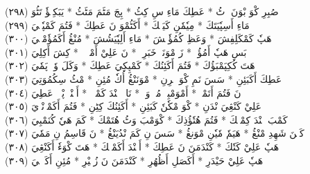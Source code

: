 \documentclass[a4paper, 10pt]{report}
\begin{document}
\begin{center}
\textarabic{(٢٩٨) \textcolor{mygreen}{صُبِرِ كْوَ بْوَنَ وٖٹُ  * عَطِكَ مَاءِ سِ كِٹُ  * پِجَ مَٹَمَ مَٹَٹُ  * يَبَكِيٖؤٗ تَٹُوَ }} 
\\[5mm] 

\textarabic{(٢٩٩) \textcolor{mygreen}{مَاءِ أَسِپٗيَتَكَ  * مِيٗمٗنِ كَيَپٖكَ  * أَكَٹُمْوَ نَ عَطِكَ  * فَتُمَ كَمْپٗكٖيَ }} 
\\[5mm] 

\textarabic{(٣٠٠) \textcolor{mygreen}{هَپٗ كَمْكَلِفِشَ  * وَعَظِ كُمُؤٗنٖشَ  * مَاءِ أَلِپٗيَشُشَ  * مُنْڠُ أَكَمُؤٗمْبٖيَ }} 
\\[5mm] 

\textarabic{(٣٠١) \textcolor{mygreen}{بَسِ هَپٗ أَمُؤُزٖ  * زَ مْوَنَوٖ خَبَرِزٖ  * نَ عَلِيْ أَمْوٖلٖزٖ  * كِشَ أَكِلِيَ }} 
\\[5mm] 

\textarabic{(٣٠٢) \textcolor{mygreen}{هَتَ كُكِپَمْبَؤُكَ  * فَتُمَ أَكَئِنُكَ  * كَمْپِكِيَ عَطِكَ  * وَكَلَ وٗتٖ پَمٗيَ }} 
\\[5mm] 

\textarabic{(٣٠٣) \textcolor{mygreen}{عَطِكَ أَكَبَئِنِ  * سَسَ نَمِ كْوَ خٖرِنِ  * مْوَنَنْڠُ أُكٗ مُئِنِ  * مْٹُ سِكُمُوَتِيَ }} 
\\[5mm] 

\textarabic{(٣٠٤) \textcolor{mygreen}{نَ فَتُمَ أَتَمْكٖ  * أَمْوَمْبِيٖ مُمٖ وَكٖ  * نَاوٖ نٖنْدَ كَمْپٖكٖ  * أَسٖنْدٖ پْوٖكٖ عَطِيَ }} 
\\[5mm] 

\textarabic{(٣٠٥) \textcolor{mygreen}{عَلِيْ كَنْڠِيَ نْدَنِ  * كْوَ مْكٗنٗ كَبَئِنِ  * أَكَئِنُكَ كِٹِنِ  * فَتُمَ أَكَمْوٖنْدٖيَ }} 
\\[5mm] 

\textarabic{(٣٠٦) \textcolor{mygreen}{كَمْبَ چٖنْدَ كِمْپٖكَ  * فَتُمَ هُتٗؤُذِكَ  * كْوَمْبَ وَٹُ هُتَمْكَ  * كَمَ هَيٗ كُنَمْبِيَ }} 
\\[5mm] 

\textarabic{(٣٠٧) \textcolor{mygreen}{كَنٖنَ شَهِدِ مْنْڠُ  * هَيَمٗ مٗيٗنِ مْوَنڠُ  * سَسَ نِ كَمَ نْدُيَنْڠُ  * نَ قَاسِمُ نِ مَمٗيَ }} 
\\[5mm] 

\textarabic{(٣٠٨) \textcolor{mygreen}{هَپٗ عَلِيْ كَتٗكَ  * كَنْدَمَنَ نَ عَطِكَ  * أَكٖنْدَ أَكَمْپٖكَ  * هَتَ كْوَءٗ أَكَنْڠِيَ }} 
\\[5mm] 

\textarabic{(٣٠٩) \textcolor{mygreen}{هَپٗ عَلِيْ حَيْدَرِ  * أَكَصَلِ أَظُهُرِ  * كَنْدَمَنَ نَ زُبٖيْرِ  * مُئِنِ أَكَرٖجٖيَ }} 
\\[5mm] 


\end{center}
\end{document}
